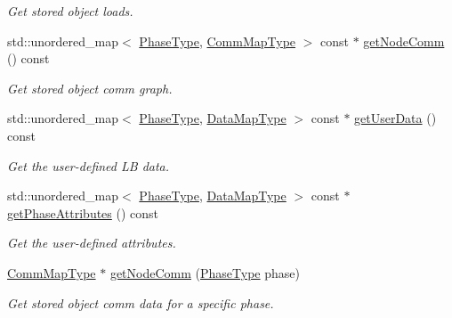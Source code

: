 \begin{DoxyCompactItemize}
\begin{DoxyCompactList}\small\item\em Get stored object loads. \end{DoxyCompactList}\item 
std\+::unordered\+\_\+map$<$ \hyperlink{namespacevt_a46ce6733d5cdbd735d561b7b4029f6d7}{Phase\+Type}, \hyperlink{namespacevt_1_1vrt_1_1collection_1_1balance_a01ee1fb0ae2da1d2ab7fdca3be9ae351}{Comm\+Map\+Type} $>$ const  $\ast$ \hyperlink{structvt_1_1vrt_1_1collection_1_1balance_1_1_node_l_b_data_a01ac3980585c93769570fd4e76ea9218}{get\+Node\+Comm} () const
\begin{DoxyCompactList}\small\item\em Get stored object comm graph. \end{DoxyCompactList}\item 
std\+::unordered\+\_\+map$<$ \hyperlink{namespacevt_a46ce6733d5cdbd735d561b7b4029f6d7}{Phase\+Type}, \hyperlink{namespacevt_1_1vrt_1_1collection_1_1balance_acf152c668ed9e2e9c6b29784181d2435}{Data\+Map\+Type} $>$ const  $\ast$ \hyperlink{structvt_1_1vrt_1_1collection_1_1balance_1_1_node_l_b_data_a73b93e4e239cc32982d5474fca1f7b64}{get\+User\+Data} () const
\begin{DoxyCompactList}\small\item\em Get the user-\/defined LB data. \end{DoxyCompactList}\item 
std\+::unordered\+\_\+map$<$ \hyperlink{namespacevt_a46ce6733d5cdbd735d561b7b4029f6d7}{Phase\+Type}, \hyperlink{namespacevt_1_1vrt_1_1collection_1_1balance_acf152c668ed9e2e9c6b29784181d2435}{Data\+Map\+Type} $>$ const  $\ast$ \hyperlink{structvt_1_1vrt_1_1collection_1_1balance_1_1_node_l_b_data_a3210dba00d8bc4220c2493f2091d4990}{get\+Phase\+Attributes} () const
\begin{DoxyCompactList}\small\item\em Get the user-\/defined attributes. \end{DoxyCompactList}\item 
\hyperlink{namespacevt_1_1vrt_1_1collection_1_1balance_a01ee1fb0ae2da1d2ab7fdca3be9ae351}{Comm\+Map\+Type} $\ast$ \hyperlink{structvt_1_1vrt_1_1collection_1_1balance_1_1_node_l_b_data_a6805869aeb1d424289ddb2b6be653595}{get\+Node\+Comm} (\hyperlink{namespacevt_a46ce6733d5cdbd735d561b7b4029f6d7}{Phase\+Type} phase)
\begin{DoxyCompactList}\small\item\em Get stored object comm data for a specific phase. \end{DoxyCompactList}\item 

\end{DoxyCompactItemize}
